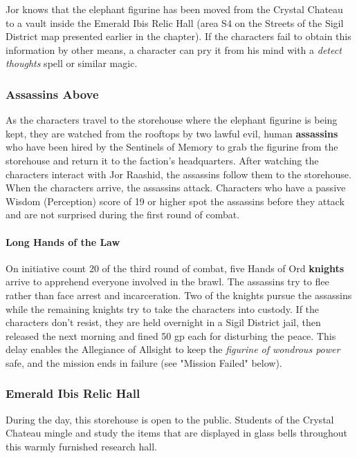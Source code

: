 \documentclass[letterpaper, 11pt, bg=full, twocolumn]{dndbook}
\begin{document}
Jor knows that the elephant figurine has been moved from the Crystal Chateau to a vault inside the Emerald Ibis Relic Hall (area S4 on the Streets of the Sigil District map presented earlier in the chapter). If the characters fail to obtain this information by other means, a character can pry it from his mind with a \textit{detect thoughts} spell or similar magic.

\subsubsection{Assassins Above}

As the characters travel to the storehouse where the elephant figurine is being kept, they are watched from the rooftops by two lawful evil, human \textbf{assassins} who have been hired by the Sentinels of Memory to grab the figurine from the storehouse and return it to the faction's headquarters. After watching the characters interact with Jor Raashid, the assassins follow them to the storehouse. When the characters arrive, the assassins attack. Characters who have a passive Wisdom (Perception) score of 19 or higher spot the assassins before they attack and are not surprised during the first round of combat.

\paragraph{Long Hands of the Law}

On initiative count 20 of the third round of combat, five Hands of Ord \textbf{knights} arrive to apprehend everyone involved in the brawl. The assassins try to flee rather than face arrest and incarceration. Two of the knights pursue the assassins while the remaining knights try to take the characters into custody. If the characters don't resist, they are held overnight in a Sigil District jail, then released the next morning and fined 50 gp each for disturbing the peace. This delay enables the Allegiance of Allsight to keep the \textit{figurine of wondrous power} safe, and the mission ends in failure (see "Mission Failed" below).

\subsubsection{Emerald Ibis Relic Hall}

During the day, this storehouse is open to the public. Students of the Crystal Chateau mingle and study the items that are displayed in glass bells throughout this warmly furnished research hall.
\end{document}
